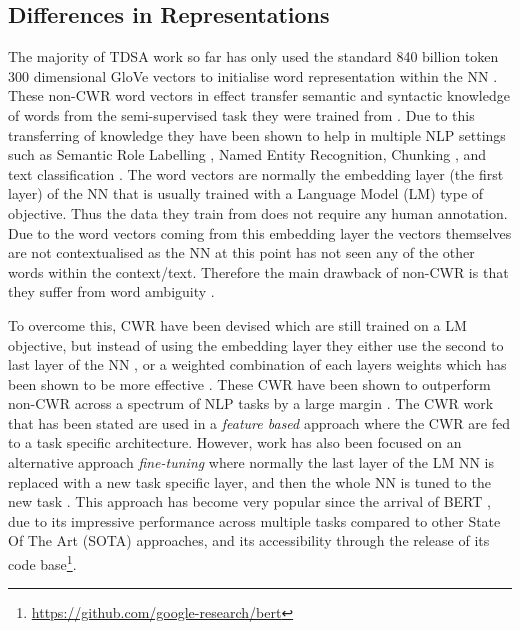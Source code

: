 \subsection{Differences in Representations}
The majority of TDSA work so far has only used the standard 840 billion token 300 dimensional GloVe vectors \citep{vectors_pennington_2014} to initialise word representation within the NN \citep{methods_tang-etal-2016-aspect,methods_tang-etal-2019-progressive}. These non-CWR word vectors in effect transfer semantic and syntactic knowledge of words from the semi-supervised task they were trained from \citep{vectors_Mikolov2013EfficientEO}. Due to this transferring of knowledge they have been shown to help in multiple NLP settings such as Semantic Role Labelling \citep{vectors_collobert2008unified}, Named Entity Recognition, Chunking \citep{vectors_turian-etal-2010-word}, and text classification \citep{vectors_kim-2014-convolutional}. The word vectors are normally the embedding layer (the first layer) of the NN that is usually trained with a Language Model (LM) type of objective. Thus the data they train from does not require any human annotation. Due to the word vectors coming from this embedding layer the vectors themselves are not contextualised as the NN at this point has not seen any of the other words within the context/text. Therefore the main drawback of non-CWR is that they suffer from word ambiguity \citep{vectors_camacho2018word}. 

To overcome this, CWR have been devised which are still trained on a LM objective, but instead of using the embedding layer they either use the second to last layer of the NN \citep{vectors_peters-etal-2017-semi}, or a weighted combination of each layers weights which has been shown to be more effective \citep{vectors_peters-etal-2018-deep}. These CWR have been shown to outperform non-CWR across a spectrum of NLP tasks by a large margin \citep{vectors_liu-etal-2019-linguistic}. The CWR work that has been stated are used in a \textit{feature based} approach where the CWR are fed to a task specific architecture. However, work has also been focused on an alternative approach \textit{fine-tuning} where normally the last layer of the LM NN is replaced with a new task specific layer, and then the whole NN is tuned to the new task \citep{vectors_Radford2018ImprovingLU, vectors_howard-ruder-2018-universal}. This approach has become very popular since the arrival of BERT \citep{vectors_devlin-etal-2019-bert}, due to its impressive performance across multiple tasks compared to other State Of The Art (SOTA) approaches, and its accessibility through the release of its code base\footnote{\url{https://github.com/google-research/bert}}. 

